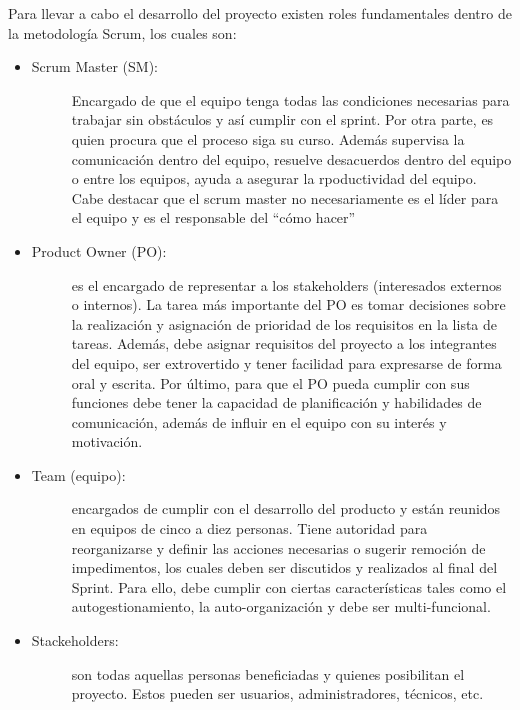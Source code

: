 Para llevar a cabo el desarrollo del proyecto existen roles fundamentales dentro de la metodología Scrum, los cuales son:

\begin{itemize}
    \item   \begin{description}
                \item[Scrum Master (SM):] Encargado de que el equipo tenga todas las condiciones necesarias para trabajar sin obstáculos y así cumplir con el sprint. Por otra parte, es quien procura que el proceso siga su curso. Además supervisa la comunicación dentro del equipo, resuelve desacuerdos dentro del equipo o entre los equipos, ayuda a asegurar la rpoductividad del equipo. Cabe destacar que el scrum master no necesariamente es el líder para el equipo y es el responsable del ``cómo hacer''
            \end{description}    
    
    \item   \begin{description}
                \item[Product Owner (PO):] es el encargado de representar a los stakeholders (interesados externos o internos). La tarea más importante del PO es tomar decisiones sobre la realización y asignación de prioridad de los requisitos en la lista de tareas. Además, debe asignar requisitos del proyecto a los integrantes del equipo, ser extrovertido y tener facilidad para expresarse de forma oral y escrita. Por último, para que el PO pueda cumplir con sus funciones debe tener la capacidad de planificación y habilidades de comunicación, además de influir en el equipo con su interés y motivación.
            \end{description} 
    
    \item   \begin{description}
                \item[Team (equipo):] encargados de cumplir con el desarrollo del producto y están reunidos en equipos de cinco a diez personas. Tiene autoridad para reorganizarse y definir las acciones necesarias o sugerir remoción de impedimentos, los cuales deben ser discutidos y realizados al final del Sprint. Para ello, debe cumplir con ciertas características tales como el autogestionamiento, la auto-organización y debe ser multi-funcional.
            \end{description} 
    
    \item   \begin{description}
                \item[Stackeholders:] son todas aquellas personas beneficiadas y quienes posibilitan el proyecto. Estos pueden ser usuarios, administradores, técnicos, etc.
            \end{description}  
\end{itemize}